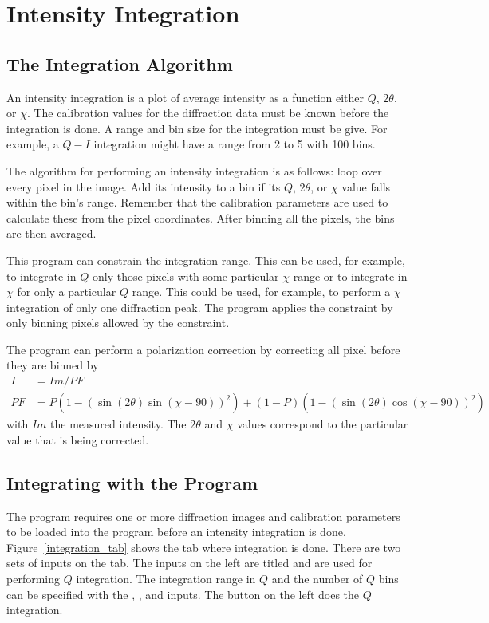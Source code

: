 \chapter{Intensity Integration}

\section{The Integration Algorithm}\label{integration_algorithm}

An intensity integration is a plot of average intensity as 
a function either $Q$, $2\theta$, or $\chi$. The calibration 
values for the diffraction data must be known before 
the integration is done. A range and bin size for the
integration must be give. For example, a $Q-I$ integration 
might have a range from 2 to 5 with 100 bins. 

The algorithm for performing an intensity integration
is as follows: loop over every pixel in the image. 
Add its intensity to a bin if its $Q$, $2\theta$, 
or $\chi$ value falls within the bin's range.
Remember that the calibration parameters are used to 
calculate these from the pixel coordinates.
After binning all the pixels, the bins are then averaged.

This program can constrain the integration range. 
This can be used, for example, to integrate
in $Q$ only those pixels with some particular 
$\chi$ range or to integrate
in $\chi$ for only a particular
$Q$ range. This could be used, for example, to
perform a $\chi$ integration of only one
diffraction peak. The program applies the constraint
by only binning pixels allowed by the constraint.

The program can perform a polarization 
correction by correcting all pixel before they
are binned by
\begin{align}
    I&=Im/PF \\ 
    PF&=P(1 - (\sin(2\theta)\sin(\chi-90))^2) + 
    (1 - P)(1 - (\sin(2\theta)\cos(\chi-90))^2)
\end{align}
with $Im$ the measured intensity.  The $2\theta$ 
and $\chi$ values correspond to the particular 
value that is being corrected.

\section{Integrating with the Program}

The program requires one or more diffraction images and
calibration parameters to be loaded into the program
before an intensity integration is done.
Figure~\ref{integration_tab} shows the
 tab where integration is done.
There are two sets of inputs on the tab. 
The inputs on the left are titled 
and are used for performing $Q$ integration.
The integration range in $Q$ and the number of $Q$ bins
can be specified with the , ,
and  inputs. The  button
on the left does the $Q$ integration.

